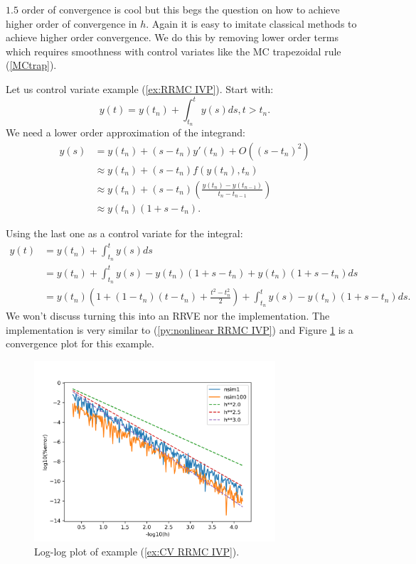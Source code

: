 \documentclass[a4paper,12pt]{article}
\begin{document}
$1.5$ order of convergence is cool but this begs the question on how to achieve
higher order of convergence in $h$. Again it is easy to imitate classical methods
to achieve higher order convergence. We do this by removing lower order terms which requires
smoothness with control variates like the MC trapezoidal rule (\ref{MCtrap}).

\begin{example}[CV RRMC $y'=y$]\label{ex:CV RRMC IVP}
    Let us control variate example (\ref{ex:RRMC IVP}). Start
    with:
    \begin{equation}
        y(t)= y(t_{n}) + \int_{t_{n}}^{t}y(s)ds , t>t_{n}.
    \end{equation}
    We need a lower order approximation of the integrand:
    \begin{align}
        y(s) & = y(t_{n}) + (s-t_{n})y'(t_{n}) + O((s-t_{n})^{2})       \\
             & \approx y(t_{n}) + (s-t_{n})f(y(t_{n}),t_{n})            \\
             & \approx y(t_{n}) +
        (s-t_{n})\left(\frac{y(t_{n})-y(t_{n-1})}{t_{n}-t_{n-1}}\right) \\
             & \approx y(t_{n})(1+s-t_{n}).
    \end{align}

    Using the last one as a control variate for the integral:
    \begin{align}
        y(t) & = y(t_{n}) + \int_{t_{n}}^{t}y(s)ds                                          \\
             & = y(t_{n}) + \int_{t_{n}}^{t}y(s)-y(t_{n})(1+s-t_{n}) +y(t_{n})(1+s-t_{n})ds \\
             & = y(t_{n})\left(1 + (1-t_{n})(t-t_{n})+\frac{t^{2}-t_{n}^{2}}{2}\right)
        + \int_{t_{n}}^{t}y(s)-y(t_{n})(1+s-t_{n})ds.
    \end{align}
    We won't discuss turning this into an RRVE nor the implementation. The implementation
    is very similar to (\ref{py:nonlinear RRMC IVP}) and
    Figure \ref{fig:CV RRMC IVP} is a convergence plot for this example.

    \begin{figure}[h!]
        \centering
        \includegraphics[width=0.8\textwidth]{plots/CV RRMC IVP.png}
        \caption{Log-log plot of example (\ref{ex:CV RRMC IVP}).}
        \label{fig:CV RRMC IVP}
    \end{figure}
\end{example}
\end{document}
